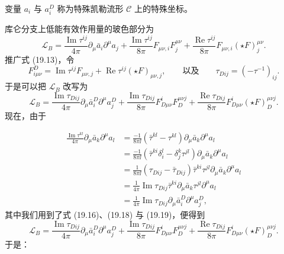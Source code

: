 \begin{definition}[19.32]
变量 $a_i$ 与 $a^D_i$ 称为特殊凯勒流形 $\mathcal{C}$ 上的特殊坐标。
\end{definition}

库仑分支上低能有效作用量的玻色部分为
\[
\mathcal{L}_B=\frac{\operatorname{Im}\tau^{ij}}{4\pi}\partial_\mu\bar a_i\partial^\mu a_j
+\frac{\operatorname{Im}\tau^{ij}}{8\pi}F_{\mu\nu,i}F^{\mu\nu}_j
+\frac{\operatorname{Re}\tau^{ij}}{8\pi}F_{\mu\nu,i}(\star F)^{\mu\nu}_j.
\]
推广式 (19.13)，令
\[
F^D_{i\mu\nu}=\operatorname{Im}\tau^{ij}F_{\mu\nu,j}+\operatorname{Re}\tau^{ij}(\star F)_{\mu\nu,j},
\qquad\text{以及}\qquad
\tau_{Dij}=(-\tau^{-1})_{ij}.
\]
于是可以把 $\mathcal{L}_B$ 改写为
\begin{equation}
\mathcal{L}_B=\frac{\operatorname{Im}\tau_{Dij}}{4\pi}\partial_\mu\bar a^D_i\partial^\mu a^D_j
+\frac{\operatorname{Im}\tau_{Dij}}{8\pi}F^i_{D\mu\nu}F^{\mu\nu j}_D
+\frac{\operatorname{Re}\tau_{Dij}}{8\pi}F^i_{D\mu\nu}(\star F)^{\mu\nu j}_D. \tag{19.19}
\end{equation}
现在，由于


\begin{align*}
\frac{\operatorname{Im}\tau^{kl}}{4\pi}\partial_\mu\bar a_k\partial^\mu a_l
&=\frac{-1}{8\pi\ii}\left(\bar\tau^{kl}-\tau^{kl}\right)\partial_\mu\bar a_k\partial^\mu a_l\\
&=\frac{-1}{8\pi\ii}\left(\bar\tau^{ki}\delta^l_i-\delta^k_j\tau^{jl}\right)\partial_\mu\bar a_k\partial^\mu a_l\\
&=\frac{1}{8\pi\ii}\left(\tau_{Dij}-\bar\tau_{Dij}\right)\bar\tau^{ki}\tau^{jl}\partial_\mu\bar a_k\partial^\mu a_l\\
&=\frac{1}{4\pi}\operatorname{Im}\tau_{Dij}\bar\tau^{ki}\partial_\mu\bar a_k\tau^{jl}\partial^\mu a_l\\
&=\frac{1}{4\pi}\operatorname{Im}\tau_{Dij}\partial_\mu\bar a^D_i\partial^\mu a^D_j,
\end{align*}
其中我们用到了式 (19.16)、(19.18) 与 (19.19)，便得到
\[
\mathcal{L}_B=\frac{\operatorname{Im}\tau_{Dij}}{4\pi}\partial_\mu\bar a^D_i\partial^\mu a^D_j
+\frac{\operatorname{Im}\tau_{Dij}}{8\pi}F^i_{D\mu\nu}F^{\mu\nu j}_D
+\frac{\operatorname{Re}\tau_{Dij}}{8\pi}F^i_{D\mu\nu}(\star F)^{\mu\nu j}_D.
\]
于是：

